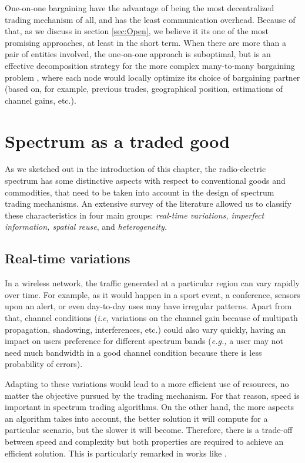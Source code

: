 One-on-one bargaining have the advantage of being the most decentralized trading mechanism of all, and has the least communication overhead. Because of that, as we discuss in section \ref{sec:Open}, we believe it its one of the most promising approaches, at least in the short term. When there are more than a pair of entities involved, the one-on-one approach is suboptimal, but is an effective decomposition strategy for the more complex many-to-many bargaining problem \cite{ref:Yan2012}, where each node would locally optimize its choice of bargaining partner (based on, for example, previous trades, geographical position, estimations of channel gains, etc.). 		

\section{Spectrum as a traded good}
\label{sec:TradedGood}
As we sketched out in the introduction of this chapter, the radio-electric spectrum has some distinctive aspects with respect to conventional goods and commodities, that need to be taken into account in the design of spectrum trading mechanisms. An extensive survey of the literature allowed us to classify these characteristics in four main groups: \textit{real-time variations, imperfect information, spatial reuse}, and \textit{heterogeneity.}

\subsection{Real-time variations}
\label{subsec:Real}
In a wireless network, the traffic generated at a particular region can vary rapidly over time. For example, as it would happen in a sport event, a conference, sensors upon an alert, or even day-to-day uses may have irregular patterns. Apart from that, channel conditions (\textit{i.e,} variations on the channel gain because of multipath propagation, shadowing, interferences, etc.) could also vary quickly, having an impact on users preference for different spectrum bands (\textit{e.g.,} a user may not need much bandwidth in a good channel condition because there is less probability of errors). 

Adapting to these variations would lead to a more efficient use of resources, no matter the objective pursued by the trading mechanism. For that reason, speed is important in spectrum trading algorithms. On the other hand, the more aspects an algorithm takes into account, the better solution it will compute for a particular scenario, but the slower it will become. Therefore, there is a trade-off between speed and complexity but both properties are required to achieve an efficient solution. This is particularly remarked in works like \cite{ref:Zhou2008,ref:Gandhi2008}.


